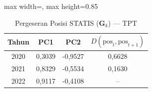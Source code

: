 \begin{table}[H]
\centering
\caption{Pergeseran Posisi STATIS ($\mathbf{G}_k$) --- TPT} \label{tab:sample1jarak_statis_loading_tpt}
\begin{adjustbox}{max width=\textwidth, max height=0.85\textheight}
\begin{tabular}{|c|c|c|c|}
\hline
\textbf{Tahun} & \textbf{PC1} & \textbf{PC2} & \textbf{$D(\text{pos}_t, \text{pos}_{t+1})$} \\
\hline
2020 & 0,3039 & -0,9527 & 0,6628 \\
2021 & 0,8329 & -0,5534 & 0,1630 \\
2022 & 0,9117 & -0,4108 & -- \\
\hline
\end{tabular}
\end{adjustbox}
\end{table}